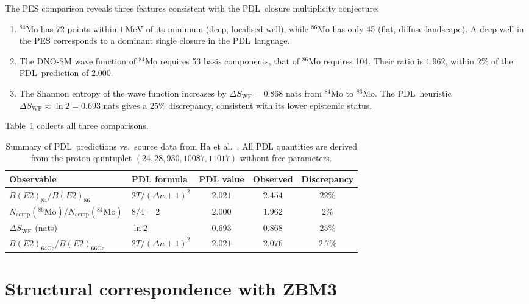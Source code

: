 \documentclass[11pt,a4paper]{article}
\theoremstyle{definition}
\newcommand{\PDL}{\textnormal{PDL}}
\newcommand{\Dn}{\Delta n}
\newcommand{\Ncomp}{N_{\mathrm{comp}}}
\newcommand{\Swf}{S_{\mathrm{WF}}}
\newcommand{\Tpdl}{T}
\begin{document}
The PES comparison reveals three features consistent with the \PDL\
closure multiplicity conjecture:
\begin{enumerate}
  \item $^{84}$Mo has 72 points within $1\,\mathrm{MeV}$ of its minimum
    (deep, localised well), while $^{86}$Mo has only 45 (flat, diffuse
    landscape). A deep well in the PES corresponds to a dominant single
    closure in the \PDL\ language.
  \item The DNO-SM wave function of $^{84}$Mo requires 53 basis components,
    that of $^{86}$Mo requires 104. Their ratio is $1.962$, within $2\%$
    of the \PDL\ prediction of $2.000$.
  \item The Shannon entropy of the wave function increases by
    $\Delta\Swf = 0.868$ nats from $^{84}$Mo to $^{86}$Mo. The \PDL\
    heuristic $\Delta\Swf \approx \ln 2 = 0.693$ nats gives a $25\%$
    discrepancy, consistent with its lower epistemic status.
\end{enumerate}

Table~\ref{tab:summary} collects all three comparisons.

\begin{table}[htbp]
\centering
\caption{%
  Summary of \PDL\ predictions vs.\ source data from Ha et al.~\cite{Ha_2025}.
  All PDL quantities are derived from the proton quintuplet
  $(24,28,930,10087,11017)$ without free parameters.
}
\label{tab:summary}
\begin{tabular}{llccc}
\toprule
Observable & PDL formula & PDL value & Observed & Discrepancy \\
\midrule
$B(E2)_{84}/B(E2)_{86}$
  & $2\Tpdl/(\Dn+1)^2$
  & $2.021$
  & $2.454$
  & $22\%$ \\
$\Ncomp(^{86}\text{Mo})/\Ncomp(^{84}\text{Mo})$
  & $8/4 = 2$
  & $2.000$
  & $1.962$
  & $2\%$ \\
$\Delta\Swf$ (nats)
  & $\ln 2$
  & $0.693$
  & $0.868$
  & $25\%$ \\
\midrule
$B(E2)_{64\text{Ge}}/B(E2)_{66\text{Ge}}$
  & $2\Tpdl/(\Dn+1)^2$
  & $2.021$
  & $2.076$
  & $2.7\%$ \\
\bottomrule
\end{tabular}
\end{table}

\section{Structural correspondence with ZBM3}
\label{sec:ZBM3}
\end{document}
